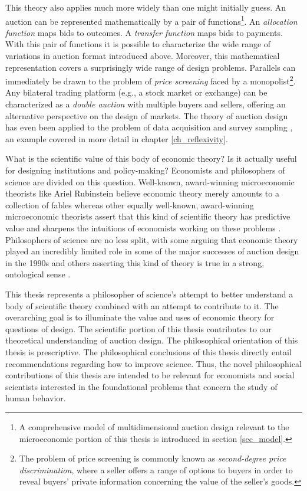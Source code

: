 This theory also applies much more widely than one might initially guess. An auction can be represented mathematically by a pair of functions\footnote{A comprehensive model of multidimensional auction design relevant to the microeconomic portion of this thesis is introduced in section \ref{sec_model}.}. An \textit{allocation function} maps bids to outcomes. A \textit{transfer function} maps bids to payments. With this pair of functions it is possible to characterize the wide range of variations in auction format introduced above. Moreover, this mathematical representation covers a surprisingly wide range of design problems. Parallels can immediately be drawn to the problem of \textit{price screening} faced by a monopolist\footnote{The problem of price screening is commonly known as \textit{second-degree price discrimination}, where a seller offers a range of options to buyers in order to reveal buyers' private information concerning the value of the seller's goods.}. Any bilateral trading platform (e.g., a stock market or exchange) can be characterized as a \textit{double auction} with multiple buyers and sellers, offering an alternative perspective on the design of markets. The theory of auction design has even been applied to the problem of data acquisition and survey sampling \autocite{roth2012surveys}, an example covered in more detail in chapter \ref{ch_reflexivity}.

What is the scientific value of this body of economic theory? Is it actually useful for designing institutions and policy-making? Economists and philosophers of science are divided on this question. Well-known, award-winning microeconomic theorists like Ariel Rubinstein believe economic theory merely amounts to a collection of fables \autocite{rubinstein2012} whereas other equally well-known, award-winning microeconomic theorists assert that this kind of scientific theory has predictive value and sharpens the intuitions of economists working on these problems \autocite{roth2019}. Philosophers of science are no less split, with some arguing that economic theory played an incredibly limited role in some of the major successes of auction design in the 1990s \autocite{nikkhah2008} and others asserting this kind of theory is true in a strong, ontological sense \autocite{ross2008}.

This thesis represents a philosopher of science's attempt to better understand a body of scientific theory combined with an attempt to contribute to it. The overarching goal is to illuminate the value and uses of economic theory for questions of design. The scientific portion of this thesis contributes to our theoretical understanding of auction design. The philosophical orientation of this thesis is prescriptive. The philosophical conclusions of this thesis directly entail recommendations regarding how to improve science. Thus, the novel philosophical contributions of this thesis are intended to be relevant for economists and social scientists interested in the foundational problems that concern the study of human behavior.


